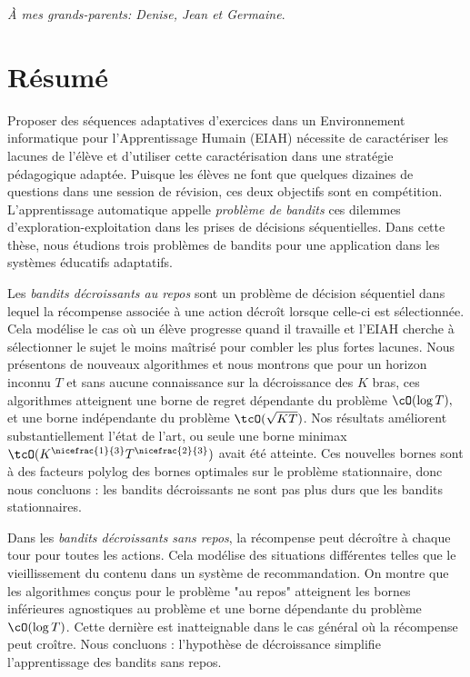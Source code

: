 \cleardoublepage
\hspace{0pt}
\vfill
\begin{flushright}
\emph{À mes grands-parents: Denise, Jean et Germaine}.
\end{flushright}
\vfill
\hspace{0pt}
\cleardoublepage
\section*{R\'esum\'e}
Proposer des séquences adaptatives d'exercices dans un Environnement informatique pour l'Apprentissage Humain (EIAH) nécessite de caractériser les lacunes de l'élève et d'utiliser cette caractérisation dans une stratégie pédagogique adaptée. Puisque les élèves ne font que quelques dizaines de questions dans une session de révision, ces deux objectifs sont en compétition. L'apprentissage automatique appelle \emph{problème de bandits} ces dilemmes d'exploration-exploitation dans les prises de décisions séquentielles. Dans cette thèse, nous étudions trois problèmes de bandits pour une application dans les systèmes éducatifs adaptatifs.

Les \emph{bandits décroissants au repos} sont un problème de décision séquentiel dans lequel la récompense associée à une action décroît lorsque celle-ci est sélectionnée. Cela modélise le cas où un élève progresse quand il travaille et l'EIAH cherche à sélectionner le sujet le moins maîtrisé pour combler les plus fortes lacunes. Nous présentons de nouveaux algorithmes et nous montrons que pour un horizon inconnu $T$ et sans aucune connaissance sur la décroissance des $K$ bras, ces algorithmes atteignent une borne de regret dépendante du problème $\cO(\log{T}),$ et une borne indépendante du problème $\tcO(\sqrt{KT})$. Nos résultats améliorent substantiellement l'état de l'art, ou seule une borne minimax $\tcO(K^{\nicefrac{1}{3}}T^{\nicefrac{2}{3}})$ avait été atteinte. Ces nouvelles bornes sont à des facteurs polylog des bornes optimales sur le problème stationnaire, donc nous concluons : les bandits décroissants ne sont pas plus durs que les bandits stationnaires.

Dans les \emph{bandits décroissants sans repos}, la récompense peut décroître à chaque tour pour toutes les actions. Cela modélise des situations différentes telles que le vieillissement du contenu dans un système de recommandation. On montre que les algorithmes conçus pour le problème "au repos" atteignent les bornes inférieures agnostiques au problème et une borne dépendante du problème $\cO(\log{T})$. Cette dernière est inatteignable dans le cas général où la récompense peut croître. Nous concluons : l'hypothèse de décroissance simplifie l'apprentissage des bandits sans repos. 

